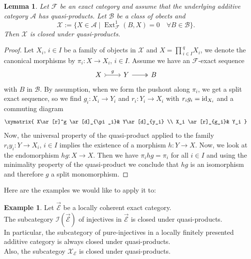 \documentclass[11pt,a4paper]{amsart}
\theoremstyle{plain}
\newtheorem{lem}[thm]{Lemma}
\theoremstyle{definition}
\newtheorem{exa}[thm]{Example}
\DeclareMathOperator{\Ext}{Ext}
\newcommand{\mcA}{\mathcal{A}}
\newcommand{\mcB}{\mathcal{B}}
\newcommand{\mcE}{\mathcal{E}}
\newcommand{\mcF}{\mathcal{F}}
\newcommand{\mcI}{\mathcal{I}}
\newcommand{\mcX}{\mathcal{X}}
\begin{document}
\begin{lem} \label{qprods}
Let $\mcF$ be an exact category and assume that the underlying additive category $\mcA$ has quasi-products. Let $\mcB$ be a class of obects and \[\mcX:=\{X\in \mcA\mid \Ext^1_{\mcF} (B,X)=0 \quad \forall B \in \mcB\}.\]
Then $\mcX$ is closed under quasi-products. 
\end{lem}

\begin{proof} 
Let $X_i$, $i \in I$ be a family of objects in $\mcX$ and $X=\prod{}^q_{i\in I}X_i$, we denote the canonical morphisms by $\pi_i \colon X \to X_i$, $i \in I$. Assume we have an $\mcF$-exact sequence 
\[
\begin{tikzcd}
X \arrow[r, "g", tail] & Y \arrow[r, two heads] & B
\end{tikzcd}
\]
with $B$ in $\mcB$. By assumption, when we form the pushout along $\pi_i$, we get a split exact sequence, so we find $g_i \colon X_i \to Y_i $ and $r_i \colon Y_i\to X_i$ with $r_ig_i={\rm id}_{X_i}$ and a commuting diagram 
\[
\xymatrix{ X\ar[r]^g \ar[d]_{\pi_i}& Y\ar[d]_{y_i} \\
X_i \ar[r]_{g_i}& Y_i
}
\]
Now, the universal property of the quasi-product applied to the family $r_i y_i \colon Y \to X_i$, $i \in I$ implies the existence of a morphism $h\colon Y \to X$. Now, we look at the endomorphism $hg\colon X \to X$. Then we have $\pi_i hg = \pi_i$ for all $i \in I$ and using the minimality property of the quasi-product we conclude that $hg$ is an isomorphism and therefore $g$ a split monomorphism. 
\end{proof}

Here are the examples we would like to apply it to:
\begin{exa}\label{Exqprods}
Let $\overrightarrow{\mcE}$ be a locally coherent exact category. \\
The subcategory $\mcI(\overrightarrow{\mcE})$ of injectives in $\overrightarrow{\mcE}$ is closed under quasi-products. \\
In particular, the subcategory of pure-injectives in a locally finitely presented additive category is always closed under quasi-products. \\
Also, the subcategoy $\mcX_{\mcE}$ is closed under quasi-products.
\end{exa}
\end{document}
